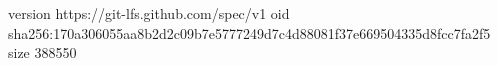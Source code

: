 version https://git-lfs.github.com/spec/v1
oid sha256:170a306055aa8b2d2c09b7e5777249d7c4d88081f37e669504335d8fcc7fa2f5
size 388550
